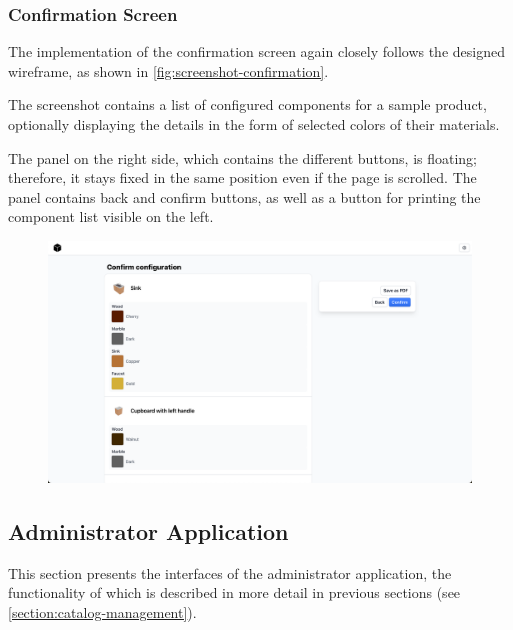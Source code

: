 \subsubsection{Confirmation Screen}

The implementation of the confirmation screen again closely follows the designed wireframe, as shown in \autoref{fig:screenshot-confirmation}.

The screenshot contains a list of configured components for a sample product, optionally displaying the details in the form of selected colors of their materials.

The panel on the right side, which contains the different buttons, is floating; therefore, it stays fixed in the same position even if the page is scrolled. The panel contains back and confirm buttons, as well as a button for printing the component list visible on the left.

\begin{figure}[h]
\centering
\includegraphics[width=\textwidth]{images/screenshot_confirmation.png}
\label{fig:screenshot-confirmation}
\end{figure}


\subsection{Administrator Application}

This section presents the interfaces of the administrator application, the functionality of which is described in more detail in previous sections (see \autoref{section:catalog-management}).

